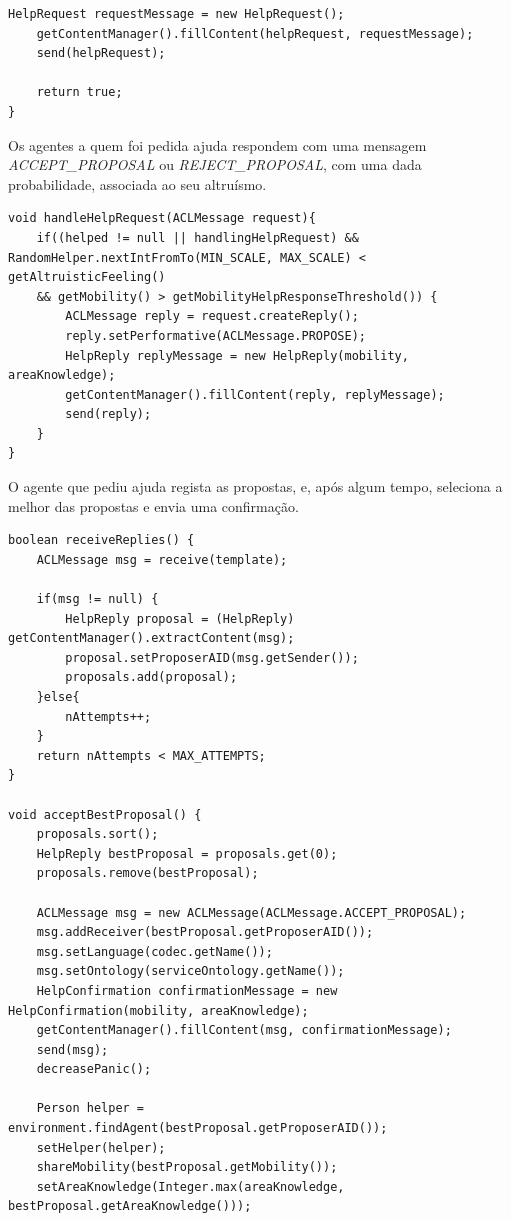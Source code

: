 \documentclass[12pt]{article}
\begin{document}
\begin{titlepage}
\begin{itemize}
\begin{lstlisting}[caption= Código \textit{Java}\ de envio de um pedido de ajuda.]
	HelpRequest requestMessage = new HelpRequest();
	getContentManager().fillContent(helpRequest, requestMessage);
	send(helpRequest);
	
	return true;
}
\end{lstlisting}

Os agentes a quem foi pedida ajuda respondem com uma mensagem \textit{ACCEPT\_PROPOSAL} ou \textit{REJECT\_PROPOSAL}, com uma dada probabilidade, associada ao seu altruísmo.

\begin{lstlisting}[caption= Código \textit{Java}\ da função responsável pela receção de pedidos de direções.]
void handleHelpRequest(ACLMessage request){
	if((helped != null || handlingHelpRequest) && RandomHelper.nextIntFromTo(MIN_SCALE, MAX_SCALE) < getAltruisticFeeling() 
	&& getMobility() > getMobilityHelpResponseThreshold()) {
		ACLMessage reply = request.createReply();
		reply.setPerformative(ACLMessage.PROPOSE);			
		HelpReply replyMessage = new HelpReply(mobility, areaKnowledge);
		getContentManager().fillContent(reply, replyMessage);
		send(reply);
	}
}
\end{lstlisting}

O agente que pediu ajuda regista as propostas, e, após algum tempo, seleciona a melhor das propostas e envia uma confirmação.

\begin{lstlisting}[caption= Código \textit{Java}\ das funções responsáveis pela receção e confirmação de prospostas de ajuda.]
boolean receiveReplies() {
	ACLMessage msg = receive(template);
	
	if(msg != null) {
		HelpReply proposal = (HelpReply) getContentManager().extractContent(msg);
		proposal.setProposerAID(msg.getSender());
		proposals.add(proposal);
	}else{
		nAttempts++;
	}
	return nAttempts < MAX_ATTEMPTS;
}

void acceptBestProposal() {
	proposals.sort();
	HelpReply bestProposal = proposals.get(0);
	proposals.remove(bestProposal);
	
	ACLMessage msg = new ACLMessage(ACLMessage.ACCEPT_PROPOSAL);
	msg.addReceiver(bestProposal.getProposerAID());
	msg.setLanguage(codec.getName());
	msg.setOntology(serviceOntology.getName());
	HelpConfirmation confirmationMessage = new HelpConfirmation(mobility, areaKnowledge);
	getContentManager().fillContent(msg, confirmationMessage);
	send(msg);
	decreasePanic();
	
	Person helper = environment.findAgent(bestProposal.getProposerAID());
	setHelper(helper);
	shareMobility(bestProposal.getMobility());		
	setAreaKnowledge(Integer.max(areaKnowledge, bestProposal.getAreaKnowledge()));
	

\end{lstlisting}
\end{itemize}
\end{titlepage}
\end{document}
